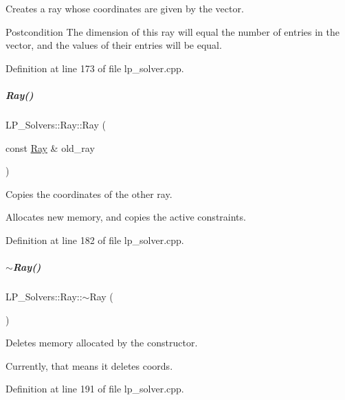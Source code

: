 Creates a ray whose coordinates are given by the vector. 

\begin{DoxyPostcond}{Postcondition}
The dimension of this ray will equal the number of entries in the vector, and the values of their entries will be equal. 
\end{DoxyPostcond}


Definition at line 173 of file lp\+\_\+solver.\+cpp.

\mbox{\label{group___c_l_s_solvers_a3a98b2f969408ba0fa58b46a3dccb9bf}} 
\subparagraph{\texorpdfstring{Ray()}{Ray()}\hspace{0.1cm}{\footnotesize\ttfamily [5/5]}}
{\footnotesize\ttfamily L\+P\+\_\+\+Solvers\+::\+Ray\+::\+Ray (\begin{DoxyParamCaption}\item[{const \hyperlink{group___c_l_s_solvers_class_l_p___solvers_1_1_ray}{Ray} \&}]{old\+\_\+ray }\end{DoxyParamCaption})}



Copies the coordinates of the other ray. 

Allocates new memory, and copies the active constraints. 

Definition at line 182 of file lp\+\_\+solver.\+cpp.

\mbox{\label{group___c_l_s_solvers_a4819e44c9151ea96204a5ca5233646f6}} 
\subparagraph{\texorpdfstring{$\sim$\+Ray()}{~Ray()}}
{\footnotesize\ttfamily L\+P\+\_\+\+Solvers\+::\+Ray\+::$\sim$\+Ray (\begin{DoxyParamCaption}{ }\end{DoxyParamCaption})}



Deletes memory allocated by the constructor. 

Currently, that means it deletes {\ttfamily coords}. 

Definition at line 191 of file lp\+\_\+solver.\+cpp.



